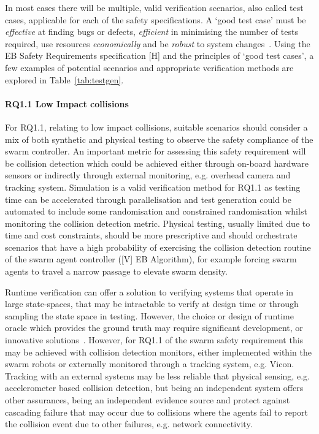 \documentclass[lettersize,journal]{IEEEtran}
\begin{document}
In most cases there will be multiple, valid verification scenarios, also called test cases, applicable for each of the safety specifications. A `good test case' must be \emph{effective} at finding bugs or defects, \emph{efficient} in minimising the number of tests required, use resources \emph{economically} and be \emph{robust} to system changes~\cite{Fewster1999}. Using the EB Safety Requirements specification [H] and the principles of `good test cases', a few examples of potential scenarios and appropriate verification methods are explored in Table~\ref{tab:testgen}. 

\paragraph{RQ1.1 Low Impact collisions}

For RQ1.1, relating to low impact collisions, suitable scenarios should consider a mix of both synthetic and physical testing to observe the safety compliance of the swarm controller. An important metric for assessing this safety requirement will be collision detection which could be achieved either through on-board hardware sensors or indirectly through external monitoring, e.g. overhead camera and tracking system. Simulation is a valid verification method for RQ1.1 as testing time can be accelerated through parallelisation and test generation could be automated to include some randomisation and constrained randomisation whilst monitoring the collision detection metric. Physical testing, usually limited due to time and cost constraints, should be more prescriptive and should orchestrate scenarios that have a high probability of exercising the collision detection routine of the swarm agent controller ([V] EB Algorithm), for example forcing swarm agents to travel a narrow passage to elevate swarm density. 

Runtime verification can offer a solution to verifying systems that operate in large state-spaces, that may be intractable to verify at design time or through sampling the state space in testing. However, the choice or design of runtime oracle which provides the ground truth may require significant development, or innovative solutions~\cite{maple2020cyres}. However, for RQ1.1 of the swarm safety requirement this may be achieved with collision detection monitors, either implemented within the swarm robots or externally monitored through a tracking system, e.g. Vicon. Tracking with an external systems may be less reliable that physical sensing, e.g. accelerometer based collision detection, but being an independent system offers other assurances, being an independent evidence source and protect against cascading failure that may occur due to collisions where the agents fail to report the collision event due to other failures, e.g. network connectivity.
\end{document}
